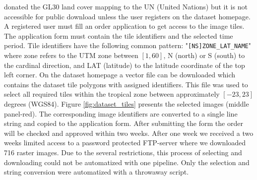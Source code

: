 		\citeauthor{Chen2015} donated the \ac{GL30} land cover mapping to the UN (United Nations) but it is not accessible for public download unless the user registers on the dataset homepage. A registered user must fill an order application to get access to the image tiles. The application form must contain the tile identifiers and the selected time period. Tile identifiers have the following common pattern: "\verb|[NS]ZONE_LAT_NAME|" where zone refers to the \ac{UTM} zone between $[1, 60]$, N (north) or S (south) to the cardinal direction, and LAT (latitude) to the latitude coordinate of the top left corner. On the dataset homepage a vector file can be downloaded which contains the dataset tile polygons with assigned identifiers. This file was used to select all required tiles within the tropical zone between approximately $[-23, 23]$ degrees (\ac{WGS84}). Figure \ref{fig:dataset_tiles} presents the selected images (middle panel-red). The corresponding image identifiers are converted to a single line string and copied to the application form. After submitting the form the order will be checked and approved within two weeks. After one week we received a two weeks limited access to a password protected FTP-server where we downloaded 716 raster images. Due to the several restrictions, this process of selecting and downloading could not be automatized with one pipeline. Only the selection and string conversion were automatized with a throwaway script.
